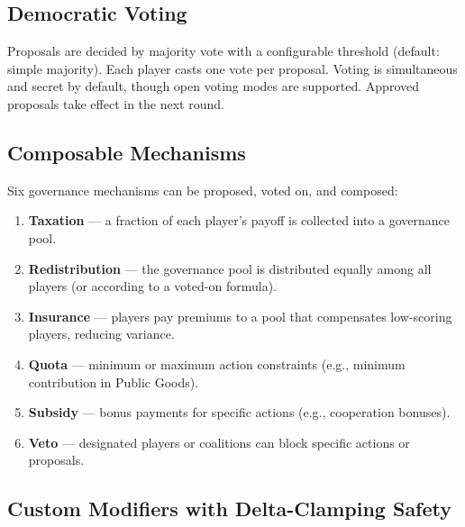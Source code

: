
\subsection{Democratic Voting}
\label{sec:voting}

Proposals are decided by majority vote with a configurable threshold (default:
simple majority). Each player casts one vote per proposal. Voting is
simultaneous and secret by default, though open voting modes are supported.
Approved proposals take effect in the next round.


\subsection{Composable Mechanisms}
\label{sec:mechanisms}

Six governance mechanisms can be proposed, voted on, and composed:

\begin{enumerate}[nosep]
    \item \textbf{Taxation} --- a fraction of each player's payoff is collected
          into a governance pool.
    \item \textbf{Redistribution} --- the governance pool is distributed
          equally among all players (or according to a voted-on formula).
    \item \textbf{Insurance} --- players pay premiums to a pool that
          compensates low-scoring players, reducing variance.
    \item \textbf{Quota} --- minimum or maximum action constraints (e.g.,
          minimum contribution in Public Goods).
    \item \textbf{Subsidy} --- bonus payments for specific actions (e.g.,
          cooperation bonuses).
    \item \textbf{Veto} --- designated players or coalitions can block
          specific actions or proposals.
\end{enumerate}


\subsection{Custom Modifiers with Delta-Clamping Safety}
\label{sec:delta-clamping}

